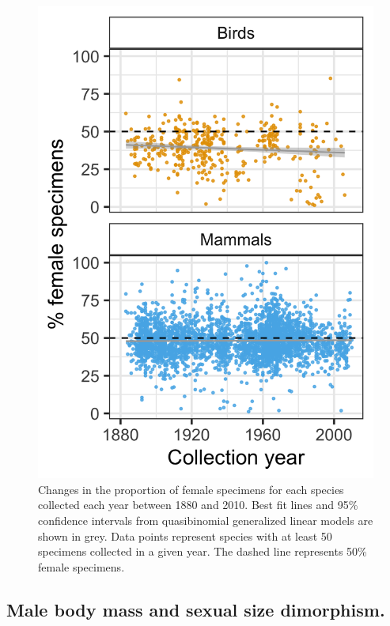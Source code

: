 \documentclass[a4paper, 12pt]{article}
\begin{document}
\begin{figure}[H]
 \centering
  \includegraphics[width = \linewidth]{figures/years-all.png}
  \caption{Changes in the proportion of female specimens for each species collected each year between 1880 and 2010. 
  Best fit lines and 95\% confidence intervals from quasibinomial generalized linear models are shown in grey. 
  Data points represent species with at least 50 specimens collected in a given year. 
  The dashed line represents 50\% female specimens.
}
  \label{fig-time}
\end{figure} 

\subsection*{Male body mass and sexual size dimorphism.}
\end{document}
